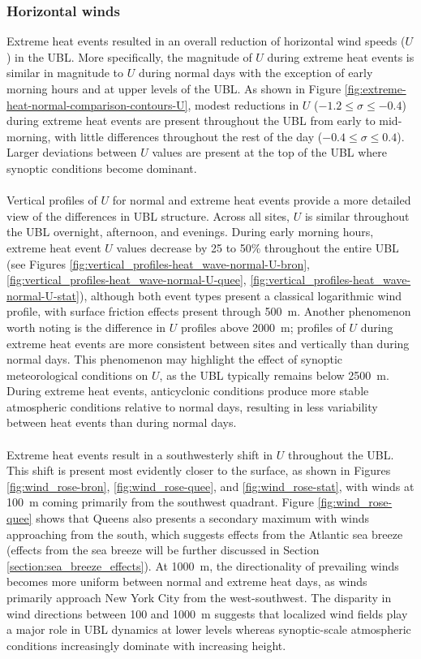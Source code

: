 \documentclass[11pt,a4paper]{article}
\begin{document}
\subsubsection{Horizontal winds}
Extreme heat events resulted in an overall reduction of horizontal wind speeds ($U$) in the UBL. More specifically, the magnitude of $U$ during extreme heat events is similar in magnitude to $U$ during normal days with the exception of early morning hours and at upper levels of the UBL. As shown in Figure \ref{fig:extreme-heat-normal-comparison-contours-U}, modest reductions in $U$ ($-1.2 \leq \sigma \leq -0.4$) during extreme heat events are present throughout the UBL from early to mid-morning, with little differences throughout the rest of the day ($-0.4 \leq \sigma \leq 0.4$). Larger deviations between $U$ values are present at the top of the UBL where synoptic conditions become dominant.
\\ \\
Vertical profiles of $U$ for normal and extreme heat events provide a more detailed view of the differences in UBL structure. Across all sites, $U$ is similar throughout the UBL overnight, afternoon, and evenings. During early morning hours, extreme heat event $U$ values decrease by 25 to 50\% throughout the entire UBL (see Figures \ref{fig:vertical_profiles-heat_wave-normal-U-bron}, \ref{fig:vertical_profiles-heat_wave-normal-U-quee}, \ref{fig:vertical_profiles-heat_wave-normal-U-stat}), although both event types present a classical logarithmic wind profile, with surface friction effects present through \SI{500}{\meter}. Another phenomenon worth noting is the difference in $U$ profiles above \SI{2000}{\meter}; profiles of $U$ during extreme heat events are more consistent between sites and vertically than during normal days. This phenomenon may highlight the effect of synoptic meteorological conditions on $U$, as the UBL typically remains below \SI{2500}{\meter}. During extreme heat events, anticyclonic conditions produce more stable atmospheric conditions relative to normal days, resulting in less variability between heat events than during normal days.
\\ \\
Extreme heat events result in a southwesterly shift in $U$ throughout the UBL. This shift is present most evidently closer to the surface, as shown in Figures \ref{fig:wind_rose-bron}, \ref{fig:wind_rose-quee}, and \ref{fig:wind_rose-stat}, with winds at \SI{100}{\meter} coming primarily from the southwest quadrant. Figure \ref{fig:wind_rose-quee} shows that Queens also presents a secondary maximum with winds approaching from the south, which suggests effects from the Atlantic sea breeze (effects from the sea breeze will be further discussed in Section \ref{section:sea_breeze_effects}). At \SI{1000}{\meter}, the directionality of prevailing winds becomes more uniform between normal and extreme heat days, as winds primarily approach New York City from the west-southwest. The disparity in wind directions between 100 and \SI{1000}{\meter} suggests that localized wind fields play a major role in UBL dynamics at lower levels whereas synoptic-scale atmospheric conditions increasingly dominate with increasing height.
\\ \\
\end{document}
